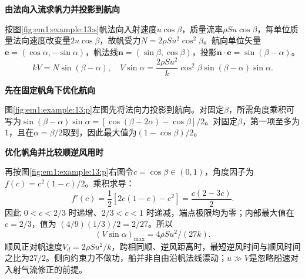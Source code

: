 \begin{solution}\textbf{由法向入流求帆力并投影到航向}\par\nobreak
按图\ref{fig:em1:example:13:s}帆法向入射速度$u\cos\beta$，质量流率$\rho Su\cos\beta$，每单位质量法向速度改变量$2u\cos\beta$，故帆受力$N=2\rho Su^2\cos^2\beta$。航向单位矢量$\bm e=(\cos\alpha,-\sin\alpha)$，帆法线$\bm n=(\sin\beta,\cos\beta)$，投影$\bm n\cdot\bm e=\sin(\beta-\alpha)$。
\[kV=N\sin(\beta-\alpha),\quad V\sin\alpha=\frac{2\rho Su^2}{k}\cos^2\beta\sin(\beta-\alpha)\sin\alpha.\]



\par\medskip{}\noindent\textbf{先在固定帆角下优化航向}\par\nobreak
图\ref{fig:em1:example:13:p}左图先将法向力投影到航向。对固定$\beta$，所需角度乘积可写为$\sin(\beta-\alpha)\sin\alpha=[\cos(\beta-2\alpha)-\cos\beta]/2$。对固定$\beta$，第一项至多为$1$，且在$\alpha=\beta/2$取到，因此最大值为$(1-\cos\beta)/2$。

\par\medskip{}\noindent\textbf{优化帆角并比较顺逆风用时}\par\nobreak
再按图\ref{fig:em1:example:13:p}右图令$c=\cos\beta\in(0,1)$，角度因子为 $f(c)=c^2(1-c)/2$。乘积求导：
\[
f'(c)=\frac12[2c(1-c)-c^2]=\frac{c(2-3c)}2.
\]
因此 $0<c<2/3$ 时递增、$2/3<c<1$ 时递减，端点极限均为零；内部最大值在 $c=2/3$，值为 $(4/9)(1/3)/2=2/27$。所以
\[\boxed{(V\sin\alpha)_{\max}=4\rho Su^2/(27k)}.\]
顺风正对帆速度$V_d=2\rho Su^2/k$，跨相同顺、逆风距离时，最短逆风时间与顺风时间之比为$\boxed{27/2}$。侧向约束力不做功，船并非自由沿帆法线漂动；$u\gg V$是忽略船速对入射气流修正的前提。\end{solution}
